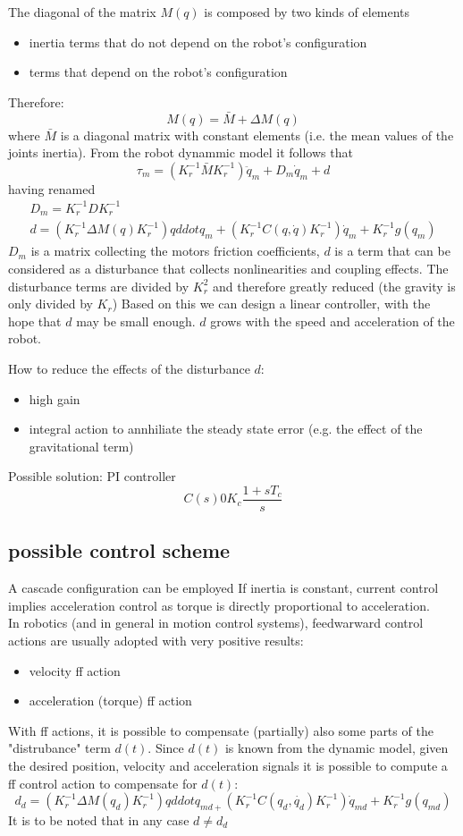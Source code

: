 \documentclass{book}
\begin{document}
The diagonal of the matrix $M(q)$ is composed by two kinds of elements
\begin{itemize}
    \item inertia terms that do not depend on the robot's configuration
    \item terms that depend on the robot's configuration
\end{itemize}
Therefore:
\[
    M(q)=\bar{M}+\Delta M(q)
\]
where $\bar{M}$ is a diagonal matrix with constant elements (i.e. the mean values of the joints inertia). From the robot dynammic model it follows that
\[
    \tau_m=(K_r^{-1}\bar{M}K_r^{-1})\ddot{q}_m+D_m\dot{q}_m+d
\]
having renamed
\begin{gather*}
    D_m=K_r^{-1}DK_r^{-1}\\
    d=(K_r^{-1}\Delta M(q)K_r^{-1})qddot{q}_m+(K_r^{-1}C(q,\dot{q})K_r^{-1})\dot{q}_m+K_r^{-1}g(q_m)
\end{gather*}
$D_m$ is a matrix collecting the motors friction coefficients, $d$ is a term that can be considered as a disturbance that collects nonlinearities and coupling effects. The disturbance terms are divided by $K_r^2$ and therefore greatly reduced (the gravity is only divided by $K_r$)
Based on this we can design a linear controller, with the hope that $d$ may be small enough. $d$ grows with the speed and acceleration of the robot.

How to reduce the effects of the disturbance $d$:
\begin{itemize}
    \item high gain
    \item integral action to annhiliate the steady state error (e.g. the effect of the gravitational term)
\end{itemize}
Possible solution: PI controller
\[
    C(s)0  K_c\frac{1+sT_c}{s}
\]
\subsection{possible control scheme}
A cascade configuration can be employed
If inertia is constant, current control implies acceleration control as torque is directly proportional to acceleration.\\
In robotics (and in general in motion control systems), feedwarward control actions are usually adopted with very positive results: 
\begin{itemize}
    \item velocity ff action
    \item acceleration (torque) ff action
\end{itemize}
With ff actions, it is possible to compensate (partially) also some parts of the "distrubance" term $d(t)$. Since $d(t)$ is known from the dynamic model, given the desired position, velocity and acceleration signals it is possible to compute a ff control action to compensate for $d(t)$:
\[
    d_d=(K_r^{-1}\Delta M(q_d)K_r^{-1})qddot{q}_{md+}(K_r^{-1}C(q_d,\dot{q_d})K_r^{-1})\dot{q}_{md}+K_r^{-1}g(q_{md})
\]
It is to be noted that in any case $d\neq d_d$
\end{document}

